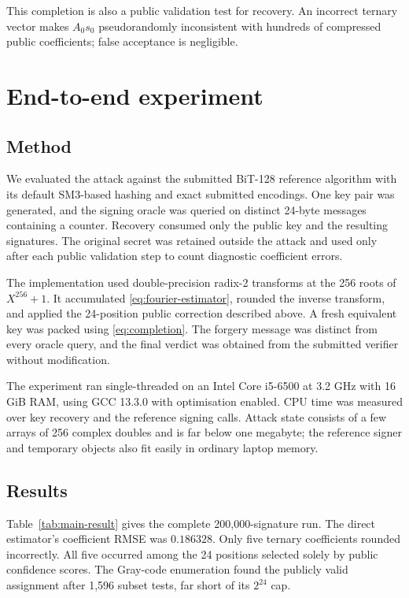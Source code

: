 \documentclass[11pt,a4paper]{article}
\begin{document}
This completion is also a public validation test for recovery.  An incorrect
ternary vector makes $A_0s_0$ pseudorandomly inconsistent with hundreds of
compressed public coefficients; false acceptance is negligible.

\section{End-to-end experiment}

\subsection{Method}

We evaluated the attack against the submitted BiT-128 reference algorithm with
its default SM3-based hashing and exact submitted encodings.  One key pair was
generated, and the signing oracle was queried on distinct 24-byte messages
containing a counter.  Recovery consumed only the public key and the resulting
signatures.  The original secret was retained outside the attack and used only
after each public validation step to count diagnostic coefficient errors.

The implementation used double-precision radix-2 transforms at the 256 roots
of $X^{256}+1$.  It accumulated \eqref{eq:fourier-estimator}, rounded the
inverse transform, and applied the 24-position public correction described
above.  A fresh equivalent key was packed using \eqref{eq:completion}.  The
forgery message was distinct from every oracle query, and the final verdict was
obtained from the submitted verifier without modification.

The experiment ran single-threaded on an Intel Core i5-6500 at 3.2 GHz with
16 GiB RAM, using GCC 13.3.0 with optimisation enabled.  CPU time was measured
over key recovery and the reference signing calls.  Attack state consists of a
few arrays of 256 complex doubles and is far below one megabyte; the reference
signer and temporary objects also fit easily in ordinary laptop memory.

\subsection{Results}

Table~\ref{tab:main-result} gives the complete 200,000-signature run.  The
direct estimator's coefficient RMSE was $0.186328$.  Only five ternary
coefficients rounded incorrectly.  All five occurred among the 24 positions
selected solely by public confidence scores.  The Gray-code enumeration found
the publicly valid assignment after 1,596 subset tests, far short of its
$2^{24}$ cap.
\end{document}
